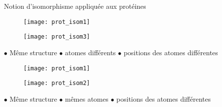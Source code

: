 \begin{frame}{Notion d'isomorphisme appliquée aux protéines}
    \small
    \begin{multicols}{3}
        \begin{figure}[!htb]
            \centering
            \texttt{[image: prot\_isom1]}
        \end{figure}
        \begin{figure}[!htb]
            \centering
            \texttt{[image: prot\_isom3]}
        \end{figure}
        $\bullet$ Même structure 
        \newline $\bullet$ atomes différents
        \newline $\bullet$ positions des atomes différentes 
    \end{multicols}
    \begin{multicols}{3}
        \begin{figure}[!htb]
            \centering
            \texttt{[image: prot\_isom1]}
        \end{figure}
        \begin{figure}[!htb]
            \centering
            \texttt{[image: prot\_isom2]}
        \end{figure}
        $\bullet$ Même structure 
        \newline $\bullet$ mêmes atomes
        \newline $\bullet$ positions des atomes différentes
    \end{multicols}
\end{frame}


